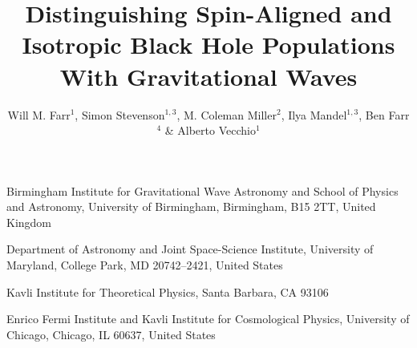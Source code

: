 \documentclass{nature}
\begin{document}

\title{Distinguishing Spin-Aligned and Isotropic Black Hole
  Populations With Gravitational Waves}

\author{Will M. Farr$^1$, Simon Stevenson$^{1,3}$, M. Coleman Miller$^2$,
  Ilya Mandel$^{1,3}$, Ben Farr$^4$ \& Alberto Vecchio$^1$}

\maketitle

\begin{affiliations}
\item Birmingham Institute for Gravitational Wave Astronomy and
  School of Physics and Astronomy, University of Birmingham,
  Birmingham, B15 2TT, United Kingdom
\item Department of Astronomy and Joint Space-Science
  Institute, University of Maryland, College Park, MD 20742--2421,
  United States
\item Kavli Institute for Theoretical Physics, Santa Barbara, CA 93106
\item Enrico Fermi Institute and Kavli Institute for Cosmological
  Physics, University of Chicago, Chicago, IL 60637, United States
\end{affiliations}
\end{document}
